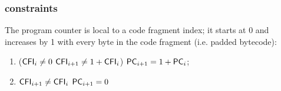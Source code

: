 \subsubsection{\PC{} constraints}

The program counter \pc{} is local to a code fragment index; it starts at 0 and increases by 1 with every byte in the code fragment (i.e. padded bytecode):
\begin{enumerate}
    \item \If \Big($\textsf{CFI}_{i} \neq 0$ \et $\textsf{CFI}_{i+1} \neq 1 + \textsf{CFI}_{i}$\Big) \Then $\textsf{PC}_{i+1}=1+\textsf{PC}_{i}$;
    \item \If $\textsf{CFI}_{i+1}\neq \textsf{CFI}_{i}$ \Then $\textsf{PC}_{i+1}=0$
\end{enumerate}
